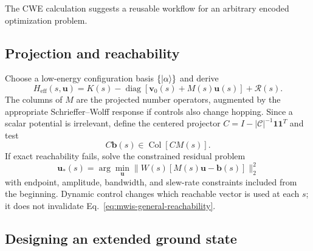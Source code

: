 The CWE calculation suggests a reusable workflow for an arbitrary encoded
optimization problem.

\subsection{Projection and reachability}

Choose a low-energy configuration basis $\{\ket{\alpha}\}$ and derive
\begin{equation}
 H_{\mathrm{eff}}(s,\mathbf u)
 =K(s)-\operatorname{diag}[\mathbf v_0(s)+M(s)\mathbf u(s)]
 +\mathcal R(s).
 \label{eq:mwis-general-effective}
\end{equation}
The columns of $M$ are the projected number operators, augmented by the
appropriate Schrieffer--Wolff response if controls also change hopping.  Since
a scalar potential is irrelevant, define the centered projector
$C=I-|\mathcal C|^{-1}\mathbf 1\mathbf 1^T$ and test
\begin{equation}
 C\mathbf b(s)\in\operatorname{Col}[CM(s)].
 \label{eq:mwis-general-reachability}
\end{equation}
If exact reachability fails, solve the constrained residual problem
\begin{equation}
 \mathbf u_*(s)=
 \arg\min_{\mathbf u}
 \|W(s)[M(s)\mathbf u-\mathbf b(s)]\|_2^2
 \label{eq:mwis-general-ls}
\end{equation}
with endpoint, amplitude, bandwidth, and slew-rate constraints included from
the beginning.  Dynamic control changes which reachable vector is used at
each $s$; it does not invalidate Eq.~\eqref{eq:mwis-general-reachability}.

\subsection{Designing an extended ground state}

